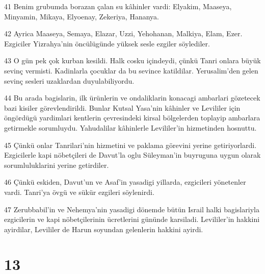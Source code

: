 \par 41 Benim grubumda borazan çalan su kâhinler vardi: Elyakim, Maaseya, Minyamin, Mikaya, Elyoenay, Zekeriya, Hananya.
\par 42 Ayrica Maaseya, Semaya, Elazar, Uzzi, Yehohanan, Malkiya, Elam, Ezer. Ezgiciler Yizrahya'nin öncülügünde yüksek sesle ezgiler söylediler.
\par 43 O gün pek çok kurban kesildi. Halk cosku içindeydi, çünkü Tanri onlara büyük sevinç vermisti. Kadinlarla çocuklar da bu sevince katildilar. Yerusalim'den gelen sevinç sesleri uzaklardan duyulabiliyordu.
\par 44 Bu arada bagislarin, ilk ürünlerin ve ondaliklarin konacagi ambarlari gözetecek bazi kisiler görevlendirildi. Bunlar Kutsal Yasa'nin kâhinler ve Levililer için öngördügü yardimlari kentlerin çevresindeki kirsal bölgelerden toplayip ambarlara getirmekle sorumluydu. Yahudalilar kâhinlerle Levililer'in hizmetinden hosnuttu.
\par 45 Çünkü onlar Tanrilari'nin hizmetini ve paklama görevini yerine getiriyorlardi. Ezgicilerle kapi nöbetçileri de Davut'la oglu Süleyman'in buyruguna uygun olarak sorumluluklarini yerine getirdiler.
\par 46 Çünkü eskiden, Davut'un ve Asaf'in yasadigi yillarda, ezgicileri yönetenler vardi. Tanri'ya övgü ve sükür ezgileri söylenirdi.
\par 47 Zerubbabil'in ve Nehemya'nin yasadigi dönemde bütün Israil halki bagislariyla ezgicilerin ve kapi nöbetçilerinin ücretlerini gününde karsiladi. Levililer'in hakkini ayirdilar, Levililer de Harun soyundan gelenlerin hakkini ayirdi.

\chapter{13}

